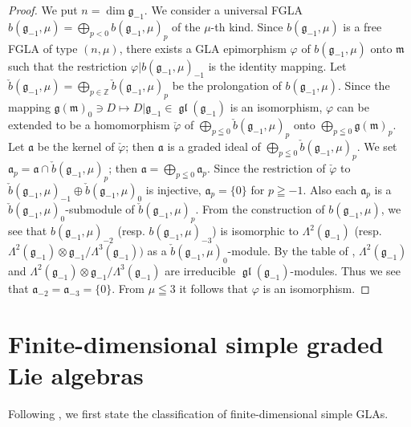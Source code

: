 \documentclass[11pt]{article}
\numberwithin{equation}{section}
\numberwithin{theorem}{section}
\numberwithin{proposition}{section}
\numberwithin{lemma}{section}
\numberwithin{corollary}{section}
\numberwithin{definition}{section}
\numberwithin{example}{section}
\numberwithin{remark}{section}
\numberwithin{note}{section}
\newcommand{\gl}{\operatorname{\mathfrak{gl}}}
\begin{document}
\begin{proof}
We put $n=\dim \mathfrak g_{-1}$. We consider a universal FGLA
$b(\mathfrak g_{-1},\mu)=\bigoplus\limits_{p<0}b(\mathfrak g_{-1},\mu)_p$ of
the $\mu$-th kind. Since $b(\mathfrak g_{-1},\mu)$
is a free FGLA of type $(n,\mu)$,
there exists a GLA epimorphism $\varphi$
of $b(\mathfrak g_{-1},\mu)$ onto $\mathfrak m$ such that the restriction
$\varphi|b(\mathfrak g_{-1},\mu)_{-1}$ is the identity mapping.
Let $\check{b}(\mathfrak g_{-1},\mu)
=\bigoplus\limits_{p\in\mathbb Z}\check{b}(\mathfrak g_{-1},\mu)_p$
be the prolongation of $b(\mathfrak g_{-1},\mu)$.
Since the mapping $\mathfrak g(\mathfrak m)_0\ni D\mapsto
D|\mathfrak g_{-1}\in\gl(\mathfrak g_{-1})$ is an isomorphism,
$\varphi$ can be extended to be a homomorphism $\check{\varphi}$
of $\bigoplus\limits_{p\leqq0}\check{b}(\mathfrak g_{-1},\mu)_p$ onto
$\bigoplus\limits_{p\leqq0}\mathfrak g(\mathfrak m)_p$.
Let $\mathfrak a$ be the kernel of $\check{\varphi}$;
then $\mathfrak a$ is a graded ideal of $\bigoplus\limits_{p\leqq0}\check{b}(\mathfrak g_{-1},\mu)_p$. We set $\mathfrak a_p
=\mathfrak a\cap \check{b}(\mathfrak g_{-1},\mu)_p$; then
$\mathfrak a=\bigoplus\limits_{p\leqq 0}\mathfrak a_p$.
Since the restriction of $\check{\varphi}$ to $\check{b}(\mathfrak g_{-1},\mu)_{-1}
\oplus \check{b}(\mathfrak g_{-1},\mu)_0$ is injective,
$\mathfrak a_p=\{0\}$ for $p\geqq-1$. Also
each $\mathfrak a_p$ is a $\check{b}(\mathfrak g_{-1},\mu)_0$-submodule of
$\check{b}(\mathfrak g_{-1},\mu)_p$.
From the construction of $b(\mathfrak g_{-1},\mu)$, we see that
$b(\mathfrak g_{-1},\mu)_{-2}$ (resp. $b(\mathfrak g_{-1},\mu)_{-3}$) is
isomorphic to
$\Lambda^2(\mathfrak g_{-1})$
(resp.\ $\Lambda^2(\mathfrak g_{-1})\otimes \mathfrak g_{-1}/
\Lambda^3(\mathfrak g_{-1}))$ as a $\check{b}(\mathfrak g_{-1},\mu)_0$-module.
By the table of \cite{ov90:1},
$\Lambda^2(\mathfrak g_{-1})$ and $\Lambda^2(\mathfrak g_{-1})\otimes
\mathfrak g_{-1}/\Lambda^3(\mathfrak g_{-1})$ are irreducible
$\gl(\mathfrak g_{-1})$-modules.
Thus we see that $\mathfrak a_{-2}=\mathfrak a_{-3}=\{0\}$.
From $\mu\leqq3$ it follows that $\varphi$ is an isomorphism.
\end{proof}


\section{Finite-dimensional simple graded Lie algebras}\label{section5}

Following \cite{yam93:1}, we f\/irst state the classif\/ication of
f\/inite-dimensional simple GLAs.
\end{document}
